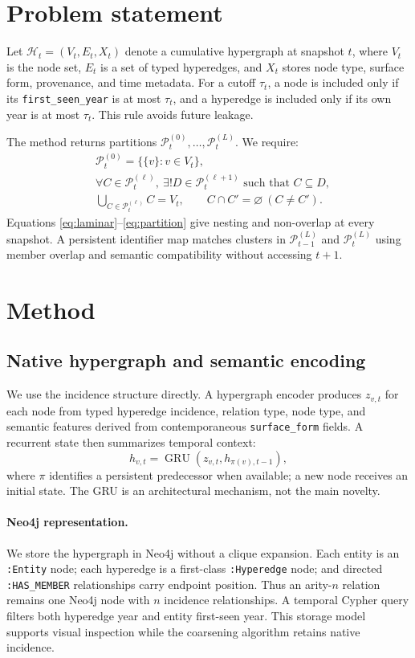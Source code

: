 \documentclass[11pt]{article}
\begin{document}
\section{Problem statement}
Let $\mathcal H_t=(V_t,E_t,X_t)$ denote a cumulative hypergraph at snapshot $t$, where $V_t$ is the node set, $E_t$ is a set of typed hyperedges, and $X_t$ stores node type, surface form, provenance, and time metadata. For a cutoff $\tau_t$, a node is included only if its \texttt{first\_seen\_year} is at most $\tau_t$, and a hyperedge is included only if its own year is at most $\tau_t$. This rule avoids future leakage.

The method returns partitions $\mathcal P_t^{(0)},\ldots,\mathcal P_t^{(L)}$. We require:
\begin{align}
&\mathcal P_t^{(0)}=\{\{v\}:v\in V_t\}, \\[-2mm]
&\forall C\in\mathcal P_t^{(\ell)},\ \exists! D\in\mathcal P_t^{(\ell+1)}\text{ such that }C\subseteq D, \label{eq:laminar}\\
&\bigcup_{C\in\mathcal P_t^{(\ell)}}C=V_t,\qquad C\cap C'=\varnothing\ (C\ne C'). \label{eq:partition}
\end{align}
Equations \ref{eq:laminar}--\ref{eq:partition} give nesting and non-overlap at every snapshot. A persistent identifier map matches clusters in $\mathcal P_{t-1}^{(L)}$ and $\mathcal P_t^{(L)}$ using member overlap and semantic compatibility without accessing $t+1$.

\section{Method}
\subsection{Native hypergraph and semantic encoding}
We use the incidence structure directly. A hypergraph encoder produces $z_{v,t}$ for each node from typed hyperedge incidence, relation type, node type, and semantic features derived from contemporaneous \texttt{surface\_form} fields. A recurrent state then summarizes temporal context:
\begin{equation}
h_{v,t}=\operatorname{GRU}(z_{v,t},h_{\pi(v),t-1}),
\end{equation}
where $\pi$ identifies a persistent predecessor when available; a new node receives an initial state. The GRU is an architectural mechanism, not the main novelty.

\paragraph{Neo4j representation.} We store the hypergraph in Neo4j without a clique expansion. Each entity is an \texttt{:Entity} node; each hyperedge is a first-class \texttt{:Hyperedge} node; and directed \texttt{:HAS\_MEMBER} relationships carry endpoint position. Thus an arity-$n$ relation remains one Neo4j node with $n$ incidence relationships. A temporal Cypher query filters both hyperedge year and entity first-seen year. This storage model supports visual inspection while the coarsening algorithm retains native incidence.
\end{document}
